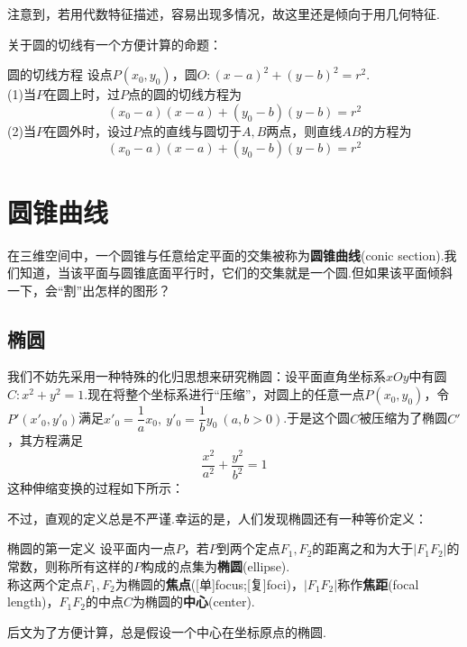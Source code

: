 \documentclass[lang=cn, zihao=5]{elegantbook}
\begin{document}
注意到，若用代数特征描述，容易出现多情况，故这里还是倾向于用几何特征.

关于圆的切线有一个方便计算的命题：

\begin{proposition}{圆的切线方程}
	设点$P(x_0,y_0)$，圆$O:(x-a)^2+(y-b)^2=r^2$. \\
	(1)当$P$在圆上时，过$P$点的圆的切线方程为$$(x_0-a)(x-a)+(y_0-b)(y-b)=r^2$$
	(2)当$P$在圆外时，设过$P$点的直线与圆切于$A,B$两点，则直线$AB$的方程为$$(x_0-a)(x-a)+(y_0-b)(y-b)=r^2$$
\end{proposition}

\section{圆锥曲线}

在三维空间中，一个圆锥与任意给定平面的交集被称为\textbf{圆锥曲线}(conic section).我们知道，当该平面与圆锥底面平行时，它们的交集就是一个圆.但如果该平面倾斜一下，会“割”出怎样的图形？

\subsection{椭圆}

我们不妨先采用一种特殊的化归思想来研究椭圆：设平面直角坐标系$xOy$中有圆$C:x^2+y^2=1$.现在将整个坐标系进行“压缩”，对圆上的任意一点$P(x_0,y_0)$，令$P'(x'_0,y'_0)$满足$x'_0=\dfrac{1}{a} x_0,~y'_0=\dfrac{1}{b} y_0~(a,b>0)$.于是这个圆$C$被压缩为了椭圆$C'$，其方程满足$$\frac{x^2}{a^2}+\frac{y^2}{b^2}=1$$
这种伸缩变换的过程如下所示：


不过，直观的定义总是不严谨.幸运的是，人们发现椭圆还有一种等价定义：

\begin{definition}{椭圆的第一定义}
	设平面内一点$P$，若$P$到两个定点$F_1,F_2$的距离之和为大于$|F_1F_2|$的常数，则称所有这样的$P$构成的点集为\textbf{椭圆}(ellipse). \\
	称这两个定点$F_1,F_2$为椭圆的\textbf{焦点}([单]focus;[复]foci)，$|F_1F_2|$称作\textbf{焦距}(focal length)，$F_1F_2$的中点$C$为椭圆的\textbf{中心}(center).
\end{definition}
\begin{remark}
	后文为了方便计算，总是假设一个中心在坐标原点的椭圆.
\end{remark}
\end{document}
